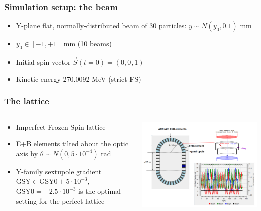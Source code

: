 \documentclass{beamer}
\begin{document}
\begin{frame}\frametitle{Simulation setup: the beam}
  \begin{itemize}
  \item Y-plane flat, normally-distributed beam of 30 particles: $y\sim N(y_0, 0.1)$ mm
  \item $y_0 \in [-1, +1]$ mm (10 beams)
  \item Initial spin vector $\vec S(t=0) = (0,0,1)$
  \item Kinetic energy 270.0092 MeV (strict FS)
  \end{itemize}
\end{frame}

\begin{frame}\frametitle{The lattice}
  \begin{columns}
    \begin{column}{.5\textwidth}
      \begin{itemize}
      \item Imperfect Frozen Spin lattice
      \item E+B elements tilted about the optic axis by $\theta\sim N(0, 5\cdot 10^{-4})$ rad
      \item Y-family sextupole gradient $\mathrm{GSY}\in \mathrm{GSY0} \pm 5\cdot 10^{-3}$, $\mathrm{GSY0}=-2.5\cdot10^{-3}$ is the optimal setting for the perfect lattice
      \end{itemize}
    \end{column}
    \begin{column}{.5\textwidth}
      \begin{center}
        \includegraphics[width=\linewidth]{../PhD/img/spin_axis_motion/presentation/lattice}
        

\end{center}
\end{column}
\end{columns}
\end{frame}
\end{document}
